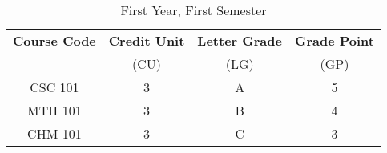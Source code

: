 \documentclass{article}
\begin{document}
	
	\begin{table}[h!]
		\begin{center}
			\caption{First Year, First Semester}
			\label{tab:table1}
			\begin{tabular}{c|c|c|c}
				\textbf{Course Code} & \textbf{Credit Unit} &
				\textbf{Letter Grade} & \textbf{Grade Point}\\
				- & (CU) & (LG) & (GP) \\
				\hline
				CSC 101 & 3 & A & 5\\
				MTH 101 & 3 & B & 4\\
				CHM 101 & 3 & C & 3\\
				\end{tabular}
		\end{center}
	\end{table}
\end{document}
